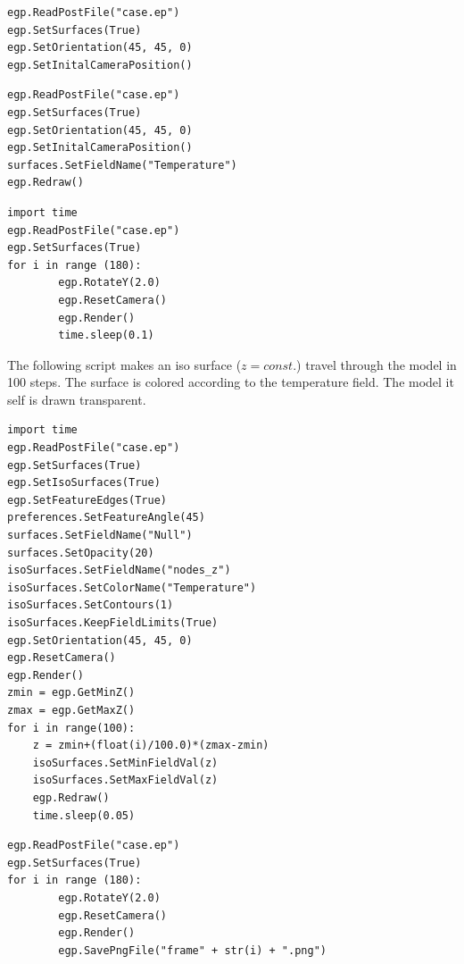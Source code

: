 \documentclass[a4paper,12pt]{article}
\begin{document}
\vskip5mm
\begin{footnotesize}
\begin{verbatim}
egp.ReadPostFile("case.ep")
egp.SetSurfaces(True)
egp.SetOrientation(45, 45, 0)
egp.SetInitalCameraPosition()
\end{verbatim}
\end{footnotesize}

\vskip5mm
\begin{footnotesize}
\begin{verbatim}
egp.ReadPostFile("case.ep")
egp.SetSurfaces(True)
egp.SetOrientation(45, 45, 0)
egp.SetInitalCameraPosition()
surfaces.SetFieldName("Temperature")
egp.Redraw()
\end{verbatim}
\end{footnotesize}


\vskip5mm
\begin{footnotesize}
\begin{verbatim}
import time
egp.ReadPostFile("case.ep")
egp.SetSurfaces(True)
for i in range (180):
        egp.RotateY(2.0)
        egp.ResetCamera()
        egp.Render()
        time.sleep(0.1)
\end{verbatim}
\end{footnotesize}


\vskip5mm
\vskip5mm
\noindent The following script makes an iso surface ($z=const.$) travel through the model
in 100 steps. The surface is colored according to the temperature field. The model it self
is drawn transparent.
\begin{footnotesize}
\begin{verbatim}
import time
egp.ReadPostFile("case.ep")
egp.SetSurfaces(True)
egp.SetIsoSurfaces(True)
egp.SetFeatureEdges(True)
preferences.SetFeatureAngle(45)
surfaces.SetFieldName("Null")
surfaces.SetOpacity(20)
isoSurfaces.SetFieldName("nodes_z")
isoSurfaces.SetColorName("Temperature")
isoSurfaces.SetContours(1)
isoSurfaces.KeepFieldLimits(True)
egp.SetOrientation(45, 45, 0)
egp.ResetCamera()
egp.Render()
zmin = egp.GetMinZ()
zmax = egp.GetMaxZ()
for i in range(100):
    z = zmin+(float(i)/100.0)*(zmax-zmin)
    isoSurfaces.SetMinFieldVal(z)
    isoSurfaces.SetMaxFieldVal(z)
    egp.Redraw()
    time.sleep(0.05)
\end{verbatim}
\end{footnotesize}


\vskip5mm
\begin{footnotesize}
\begin{verbatim}
egp.ReadPostFile("case.ep")
egp.SetSurfaces(True)
for i in range (180):
        egp.RotateY(2.0)
        egp.ResetCamera()
        egp.Render()
        egp.SavePngFile("frame" + str(i) + ".png")
\end{verbatim}
\end{footnotesize}
\end{document}
